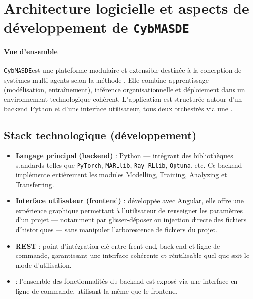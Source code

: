 \section*{Architecture logicielle et aspects de développement de \texttt{CybMASDE}}

\paragraph{Vue d’ensemble}
\texttt{CybMASDE}\footnotemark[1] est une plateforme modulaire et extensible destinée à la conception de systèmes multi-agents selon la méthode . Elle combine apprentissage (modélisation, entraînement), inférence organisationnelle et déploiement dans un environnement technologique cohérent. L'application est structurée autour d'un backend Python et d'une interface utilisateur, tous deux orchestrés via une  .



\subsection*{Stack technologique (développement)}

\begin{itemize}
  \item \textbf{Langage principal (backend)} : Python — intégrant des bibliothèques standards telles que \texttt{PyTorch}, \texttt{MARLlib}, \texttt{Ray RLlib}, \texttt{Optuna}, etc. Ce backend implémente entièrement les modules Modelling, Training, Analyzing et Transferring.
  \item \textbf{Interface utilisateur (frontend)} : développée avec Angular, elle offre une expérience graphique permettant à l’utilisateur de renseigner les paramètres d’un projet — notamment par glisser-déposer ou injection directe des fichiers d’historiques — sans manipuler l’arborescence de fichiers du projet.
  \item \textbf{ REST} : point d’intégration clé entre front-end, back-end et ligne de commande, garantissant une interface cohérente et réutilisable quel que soit le mode d’utilisation.
  \item \textbf{} : l’ensemble des fonctionnalités du backend est exposé via une interface en ligne de commande, utilisant la même   que le frontend.
\end{itemize}

